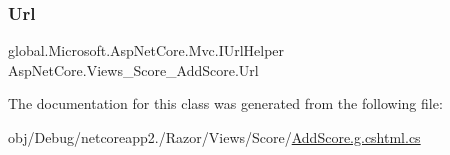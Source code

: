 \subsubsection{\texorpdfstring{Url}{Url}}
{\footnotesize\ttfamily global.\+Microsoft.\+Asp\+Net\+Core.\+Mvc.\+I\+Url\+Helper Asp\+Net\+Core.\+Views\+\_\+\+Score\+\_\+\+Add\+Score.\+Url\hspace{0.3cm}{\ttfamily [get]}}



The documentation for this class was generated from the following file\+:\begin{DoxyCompactItemize}
\item 
obj/\+Debug/netcoreapp2./\+Razor/\+Views/\+Score/\mbox{\hyperlink{_add_score_8g_8cshtml_8cs}{Add\+Score.\+g.\+cshtml.\+cs}}\end{DoxyCompactItemize}
